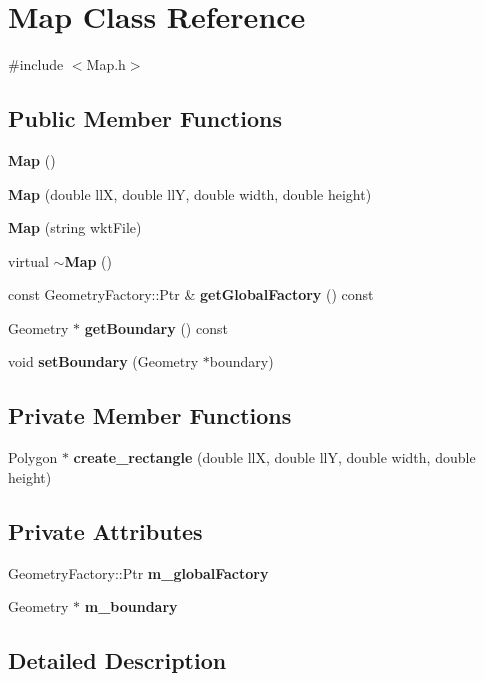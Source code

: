 \section{Map Class Reference}
\label{class_map}


{\ttfamily \#include $<$Map.\+h$>$}

\subsection*{Public Member Functions}
\begin{DoxyCompactItemize}
\item 
\textbf{ Map} ()
\item 
\textbf{ Map} (double llX, double llY, double width, double height)
\item 
\textbf{ Map} (string wkt\+File)
\item 
virtual \textbf{ $\sim$\+Map} ()
\item 
const Geometry\+Factory\+::\+Ptr \& \textbf{ get\+Global\+Factory} () const
\item 
Geometry $\ast$ \textbf{ get\+Boundary} () const
\item 
void \textbf{ set\+Boundary} (Geometry $\ast$boundary)
\end{DoxyCompactItemize}
\subsection*{Private Member Functions}
\begin{DoxyCompactItemize}
\item 
Polygon $\ast$ \textbf{ create\+\_\+rectangle} (double llX, double llY, double width, double height)
\end{DoxyCompactItemize}
\subsection*{Private Attributes}
\begin{DoxyCompactItemize}
\item 
Geometry\+Factory\+::\+Ptr \textbf{ m\+\_\+global\+Factory}
\item 
Geometry $\ast$ \textbf{ m\+\_\+boundary}
\end{DoxyCompactItemize}


\subsection{Detailed Description}


